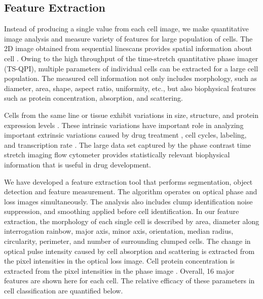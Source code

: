 \documentclass[aps,pra,reprint,longbibliography,superscriptaddress]{revtex4-1}
\begin{document}
\subsection{Feature Extraction}

Instead of producing a single value from each cell image, we make quantitative image analysis and measure variety of features for large population of cells. The 2D image obtained from sequential linescans provides spatial information about cell \cite{mahjoubfar2013optically, driscoll2012automated}. Owing to the high throughput of the time-stretch quantitative phase imager (TS-QPI), multiple parameters of individual cells can be extracted for a large cell population. The measured cell information not only includes morphology, such as diameter, area, shape, aspect ratio, uniformity, etc., but also biophysical features such as protein concentration, absorption, and scattering.

Cells from the same line or tissue exhibit variations in size, structure, and protein expression levels \cite{kaern2005stochasticity, maheshri2007living, zangle2014live}. These intrinsic variations have important role in analyzing important extrinsic variations caused by drug treatment \cite{spencer2009non}, cell cycles, labeling, and transcription rate \cite{johnston2012mitochondrial}. The large data set captured by the phase contrast time stretch imaging flow cytometer provides statistically relevant biophysical information that is useful in drug development.

We have developed a feature extraction tool that performs segmentation, object detection and feature measurement. The algorithm operates on optical phase and loss images simultaneously. The analysis also includes clump identification noise suppression, and smoothing applied before cell identification. In our feature extraction, the morphology of each single cell is described by area, diameter along interrogation rainbow, major axis, minor axis, orientation, median radius, circularity, perimeter, and number of surrounding clumped cells. The change in optical pulse intensity caused by cell absorption and scattering is extracted from the pixel intensities in the optical loss image. Cell protein concentration is extracted from the pixel intensities in the phase image \cite{barer1953refractometry}. Overall, 16 major features are shown here for each cell. The relative efficacy of these parameters in cell classification are quantified below.
\end{document}
